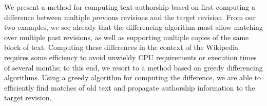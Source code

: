 We present a method for computing text authorship based on
first computing a difference between multiple previous revisions and
the target revision.
From our two examples, we see already that the differencing
algorithm must allow matching over multiple past revisions, as
well as supporting multiple copies of the same block of text.
Computing these differences in the context of the Wikipedia
requires some efficiency to avoid unwieldy CPU requirements
or execution times of several months;
to this end, we resort to a method based on greedy differencing
algorithms.
Using a greedy algorithm for computing the difference, we are
able to efficiently find matches of old text and propagate authorship
information to the target revision.

